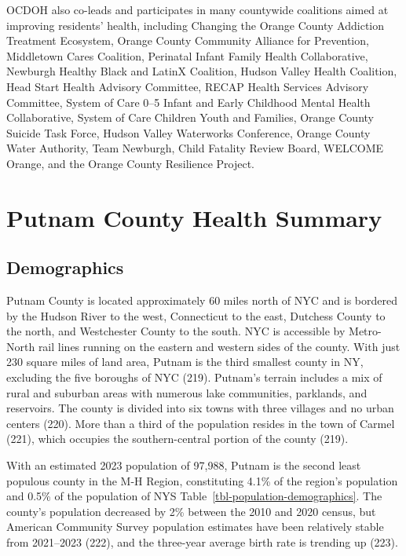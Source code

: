 \documentclass[
  english,
  letterpaper,
]{report}
\begin{document}
OCDOH also co-leads and participates in many countywide coalitions aimed
at improving residents' health, including Changing the Orange County
Addiction Treatment Ecosystem, Orange County Community Alliance for
Prevention, Middletown Cares Coalition, Perinatal Infant Family Health
Collaborative, Newburgh Healthy Black and LatinX Coalition, Hudson
Valley Health Coalition, Head Start Health Advisory Committee, RECAP
Health Services Advisory Committee, System of Care 0--5 Infant and Early
Childhood Mental Health Collaborative, System of Care Children Youth and
Families, Orange County Suicide Task Force, Hudson Valley Waterworks
Conference, Orange County Water Authority, Team Newburgh, Child Fatality
Review Board, WELCOME Orange, and the Orange County Resilience Project.

\section{Putnam County Health
Summary}\label{putnam-county-health-summary}

\subsection{Demographics}\label{demographics-2}

Putnam County is located approximately 60 miles north of NYC and is
bordered by the Hudson River to the west, Connecticut to the east,
Dutchess County to the north, and Westchester County to the south. NYC
is accessible by Metro-North rail lines running on the eastern and
western sides of the county. With just 230 square miles of land area,
Putnam is the third smallest county in NY, excluding the five boroughs
of NYC (219). Putnam's terrain includes a mix of rural and suburban
areas with numerous lake communities, parklands, and reservoirs. The
county is divided into six towns with three villages and no urban
centers (220). More than a third of the population resides in the town
of Carmel (221), which occupies the southern-central portion of the
county (219).

With an estimated 2023 population of 97,988, Putnam is the second least
populous county in the M-H Region, constituting 4.1\% of the region's
population and 0.5\% of the population of NYS
Table~\ref{tbl-population-demographics}. The county's population
decreased by 2\% between the 2010 and 2020 census, but American
Community Survey population estimates have been relatively stable from
2021--2023 (222), and the three-year average birth rate is trending up
(223).
\end{document}
